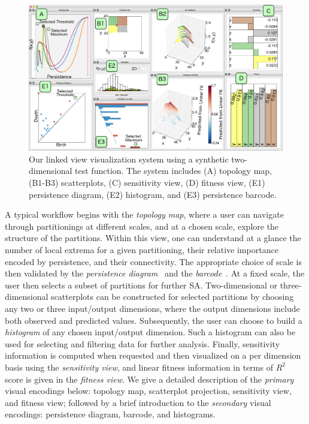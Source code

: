 \begin{figure}[b]
  \centering
  \includegraphics[width=\linewidth]{figs/chap6/design-overview}
  \caption{Our linked view visualization system using a synthetic two-dimensional test function.
  The system includes (A) topology map, (B1-B3) scatterplots, (C) sensitivity view, (D) fitness view, (E1) persistence diagram, (E2) histogram, and (E3) persistence barcode.
  }
  \label{fig:design-overview}
\end{figure}

A typical workflow begins with the \emph{topology map}, where a user can navigate through partitionings at different scales, and at a chosen scale, explore the structure of the partitions.
%
Within this view, one can understand at a glance the number of local extrema for a given partitioning, their relative importance encoded by persistence, and their connectivity.
%
The appropriate choice of scale is then validated by the \emph{persistence diagram}~\cite{Cohen-SteinerEdelsbrunnerHarer2007} and the \emph{barcode}~\cite{CarlssonZomorodianCollins2004}.
%
At a fixed scale, the user then selects a subset of partitions for further SA.
%
Two-dimensional or three-dimensional scatterplots can be constructed for selected partitions by choosing any two or three input/output dimensions, where the output dimensions include both observed and predicted values.
%
Subsequently, the user can choose to build a \emph{histogram} of any chosen input/output dimension.
%
Such a histogram can also be used for selecting and filtering data for further analysis.
%
Finally, sensitivity information is computed when requested and then visualized on a per dimension basis using the \emph{sensitivity view}, and linear fitness information in terms of $R^2$ score is given in the \emph{fitness view}.
%
We give a detailed description of the \emph{primary} visual encodings below: topology map, scatterplot projection, sensitivity view, and fitness view;  followed by a brief introduction to the \emph{secondary} visual encodings: persistence diagram, barcode, and histograms.

